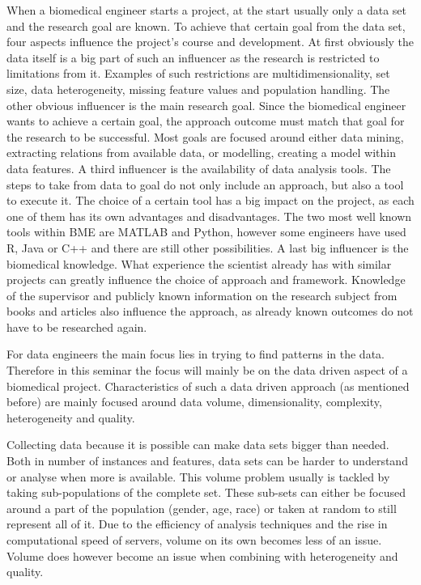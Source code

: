 \documentclass[10pt,a4paper]{article}
\begin{document}
	When a biomedical engineer starts a project, at the start usually only a data set and the research goal are known. To achieve that certain goal from the data set, four aspects influence the project's course and development. At first obviously the data itself is a big part of such an influencer as the research is restricted to limitations from it. Examples of such restrictions are multidimensionality, set size, data heterogeneity, missing feature values and population handling. The other obvious influencer is the main research goal. Since the biomedical engineer wants to achieve a certain goal, the approach outcome must match that goal for the research to be successful. Most goals are focused around either data mining, extracting relations from available data, or modelling, creating a model within data features. A third influencer is the availability of data analysis tools. The steps to take from data to goal do not only include an approach, but also a tool to execute it. The choice of a certain tool has a big impact on the project, as each one of them has its own advantages and disadvantages. The two most well known tools within BME are MATLAB and Python, however some engineers have used R, Java or C++ and there are still other possibilities. A last big influencer is the biomedical knowledge. What experience the scientist already has with similar projects can greatly influence the choice of approach and framework. Knowledge of the supervisor and publicly known information on the research subject from books and articles also influence the approach, as already known outcomes do not have to be researched again. 
	
	For data engineers the main focus lies in trying to find patterns in the data. Therefore in this seminar the focus will mainly be on the data driven aspect of a biomedical project. Characteristics of such a data driven approach (as mentioned before) are mainly focused around data volume, dimensionality, complexity, heterogeneity and quality.\cite{chen2006medical, doi:10.1093/bib/bbx044}
	
	Collecting data because it is possible can make data sets bigger than needed. Both in number of instances and features, data sets can be harder to understand or analyse when more is available.\cite{chen2006medical} This volume problem usually is tackled by taking sub-populations of the complete set. These sub-sets can either be focused around a part of the population (gender, age, race) or taken at random to still represent all of it. Due to the efficiency of analysis techniques and the rise in computational speed of servers\cite{blythe2008rise}, volume on its own becomes less of an issue. Volume does however become an issue when combining with heterogeneity and quality. \cite{Turkay2014, Holzinger2014} 
	
\end{document}
